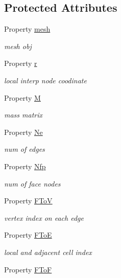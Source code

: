 \subsection*{Protected Attributes}
\begin{DoxyCompactItemize}
\item 
Property \hyperlink{class_ndg_inner_edge_a703bdf93b4da38294056ccc9e4042491}{mesh}
\begin{DoxyCompactList}\small\item\em mesh obj \end{DoxyCompactList}\item 
Property \hyperlink{class_ndg_inner_edge_a64fedc149792eb04fd88f33f83e9d591}{r}
\begin{DoxyCompactList}\small\item\em local interp node coodinate \end{DoxyCompactList}\item 
Property \hyperlink{class_ndg_inner_edge_a9a7e32e35c84d2fd1d0064f3dc85a7eb}{M}
\begin{DoxyCompactList}\small\item\em mass matrix \end{DoxyCompactList}\item 
Property \hyperlink{class_ndg_inner_edge_a203f9b68e29d46b8e0dd1d7c9d93de3d}{Ne}
\begin{DoxyCompactList}\small\item\em num of edges \end{DoxyCompactList}\item 
Property \hyperlink{class_ndg_inner_edge_a298ad4899897fba80c8cf847b1e1feaf}{Nfp}
\begin{DoxyCompactList}\small\item\em num of face nodes \end{DoxyCompactList}\item 
Property \hyperlink{class_ndg_inner_edge_a3ec846592c62efced4890b26658236e2}{F\+ToV}
\begin{DoxyCompactList}\small\item\em vertex index on each edge \end{DoxyCompactList}\item 
Property \hyperlink{class_ndg_inner_edge_a3cf87ecde96e64a42201765f4db1a4b4}{F\+ToE}
\begin{DoxyCompactList}\small\item\em local and adjacent cell index \end{DoxyCompactList}\item 
Property \hyperlink{class_ndg_inner_edge_a6a9420c12631cc6c93dc07a25985d7ae}{F\+ToF}

\end{DoxyCompactItemize}
